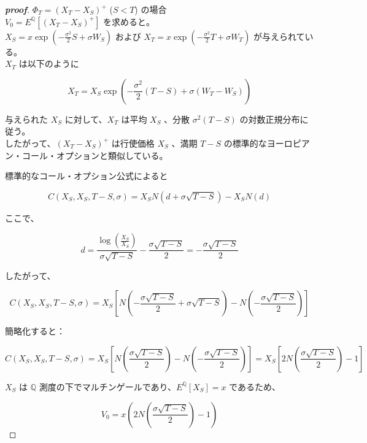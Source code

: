 \documentclass[a4paper,11pt]{jsarticle}
\begin{document}
\begin{proof}[\textbf{proof}]
$\Phi_T = (X_T - X_S)^+$ ($S < T$) の場合\\  

$V_0 = E^\mathbb{Q}[(X_T - X_S)^+]$ を求めると。\\  

$X_S = x\exp\left(-\frac{\sigma^2}{2}S + \sigma W_S\right)$ および $X_T = x\exp\left(-\frac{\sigma^2}{2}T + \sigma W_T\right)$ が与えられている。\\


$X_T$ は以下のように  

\[  
X_T = X_S\exp\left(-\frac{\sigma^2}{2}(T-S) + \sigma(W_T - W_S)\right)  
\]  

与えられた $X_S$ に対して、$X_T$ は平均 $X_S$ 、分散 $\sigma^2(T-S)$ の対数正規分布に従う。\\  

したがって、$(X_T - X_S)^+$ は行使価格 $X_S$ 、満期 $T-S$ の標準的なヨーロピアン・コール・オプションと類似している。  

標準的なコール・オプション公式によると

\[  
C(X_S, X_S, T-S, \sigma) = X_SN\left(d + \sigma\sqrt{T-S}\right) - X_SN(d)  
\]  

ここで、  

\[  
d = \frac{\log\left(\frac{X_S}{X_S}\right)}{\sigma\sqrt{T-S}} - \frac{\sigma\sqrt{T-S}}{2} = -\frac{\sigma\sqrt{T-S}}{2}  
\]  

したがって、  

\[  
C(X_S, X_S, T-S, \sigma) = X_S\left[N\left(-\frac{\sigma\sqrt{T-S}}{2} + \sigma\sqrt{T-S}\right) - N\left(-\frac{\sigma\sqrt{T-S}}{2}\right)\right]  
\]  

簡略化すると：  

\[  
C(X_S, X_S, T-S, \sigma) = X_S\left[N\left(\frac{\sigma\sqrt{T-S}}{2}\right) - N\left(-\frac{\sigma\sqrt{T-S}}{2}\right)\right] = X_S\left[2N\left(\frac{\sigma\sqrt{T-S}}{2}\right) - 1\right]  
\]  

$X_S$ は $\mathbb{Q}$ 測度の下でマルチンゲールであり、$E^\mathbb{Q}[X_S] = x$ であるため、  

\[  
V_0 = x\left(2N\left(\frac{\sigma\sqrt{T-S}}{2}\right) - 1\right)  
\]
  
\end{proof}
\end{document}
